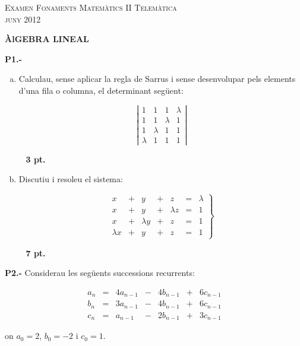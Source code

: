 \documentclass{report}
\begin{document}
\begin{center}
\textsc{Examen Fonaments Matemàtics II
Telem\`{a}tica\\
juny 2012}
\end{center}

\vspace{0.5 cm}
\noindent
\textbf{ÀlGEBRA LINEAL}

\vspace{0.5 cm}
\noindent\textbf{P1.-}

\begin{enumerate}[a)]

\item
Calculau, sense aplicar la regla de Sarrus i sense desenvolupar pels elements
d'una fila o columna, el determinant següent:

\[
\left| 
\begin{array}{cccc}
1 & 1 & 1 & \lambda \\
1 & 1 & \lambda & 1 \\
1 & \lambda & 1 & 1 \\
\lambda & 1 & 1 & 1
\end{array}
\right|
\]

\ \hfill{\textbf{ 3 pt.}}

\item 
Discutiu i resoleu el sistema:

\[
\left.
\begin{array}{ccccccc}
x & + & y & + & z & = & \lambda \\
x & + & y & + & \lambda z & = & 1 \\
x & + & \lambda y & + & z & = & 1 \\
\lambda x & + & y & + & z & = & 1 
\end{array}
\right\}
\]

\ \hfill{\textbf{ 7 pt.}}

\end{enumerate}

\vspace{0.5 cm}
\noindent\textbf{P2.-}
Considerau les següents successions recurrents:

\[
\begin{array}{ccccccc}
a_n & = & 4a_{n-1} & - & 4b_{n-1} & + & 6c_{n-1} \\
b_n & = & 3a_{n-1} & - & 4b_{n-1} & + & 6c_{n-1} \\
c_n & = &  a_{n-1} & - & 2b_{n-1} & + & 3c_{n-1}
\end{array}
\]

\noindent
on $a_0=2$, $b_0=-2$ i $c_0=1$.
\end{document}
